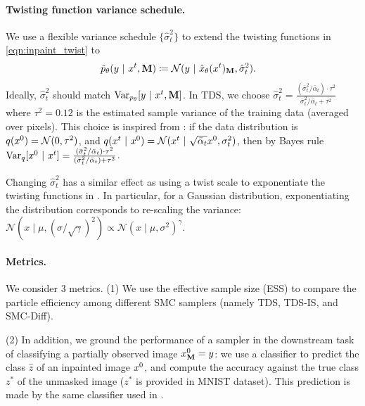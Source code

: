 \paragraph{Twisting function variance schedule.} We use a flexible variance schedule $\{\hat \sigma_t^2\}$ to extend the twisting functions in \cref{eqn:inpaint_twist} to  
\begin{align}
 \tilde p_\theta (y ~\vert~ x^{t}, \mathbf{M}) &\coloneqq \mathcal{N}(y ~\vert~ {\hat x}_\theta(x^{t})_{\mathbf{M}}, \hat \sigma_t^2). 
\end{align}
Ideally, $\hat \sigma_t^2$ should match $\mathrm{Var}_{p_{\theta}} [y ~\vert~ x^{t}, \mathbf{M}]$. In TDS, we choose $\hat \sigma_t^2 = \frac{ (\bar \sigma_t^2 / \bar \alpha_t ) \cdot \tau^2}{ \bar \sigma_t^2 / \bar \alpha_t + \tau^2}$ where $\tau^2 = 0.12$  is the estimated sample variance of the training data (averaged over pixels). This choice is inspired from \citet[Appendix A.3]{song2023pseudoinverse}: if the data distribution is $q(x^{0}) = \mathcal{N}(0, \tau^2)$, and $q(x^{t} ~\vert~ x^{0}) = \mathcal{N}(x^{t} ~\vert~ \sqrt{\bar \alpha_t} x^{0}, \sigma_t^2)$, then by Bayes rule $\mathrm{Var}_q[x^{0} ~\vert~ x^{t}] =  \frac{ (\bar \sigma_t^2 / \bar \alpha_t ) \cdot \tau^2}{ (\bar \sigma_t^2 / \bar \alpha_t) + \tau^2}$. 

Changing $\hat \sigma_t^2$ has a similar effect as using a twist scale to exponentiate the twisting functions in . In particular, for a Gaussian distribution, exponentiating the distribution corresponds to re-scaling the variance: $\mathcal{N}(x\mid \mu, (\sigma/\sqrt{\gamma})^2)  \propto \mathcal{N}(x\mid \mu, \sigma^2)^{\gamma}$.








\paragraph{Metrics.} We consider 3 metrics. (1) We use the effective sample size (ESS) to compare the particle efficiency among different SMC samplers (namely TDS, TDS-IS, and SMC-Diff).

(2) In addition, we ground the performance of 
a sampler in the downstream task of classifying a partially observed image $x^{0}_{\mathbf{M}} = y$: we use a classifier to predict the class $\hat z$ of an inpainted image $x^{0}$, and compute the accuracy against the true class $z^*$ of the unmasked image ($z^*$ is provided in MNIST dataset). This prediction is made by the same classifier used in . 


